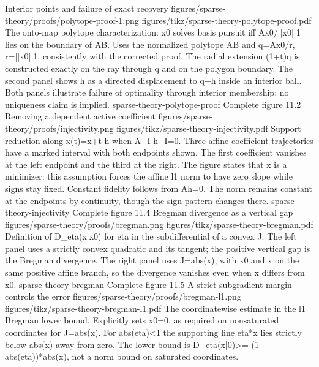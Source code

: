 {Interior points and failure of exact recovery}
{figures/sparse-theory/proofs/polytope-proof-1.png}
{figures/tikz/sparse-theory-polytope-proof.pdf}
{The onto-map polytope characterization: x0 solves basis pursuit iff Ax0/||x0||1 lies on the boundary of AB.}
{Uses the normalized polytope AB and q=Ax0/r, r=||x0||1, consistently with the corrected proof. The radial extension (1+t)q is constructed exactly on the ray through q and on the polygon boundary. The second panel shows h as a directed displacement to q+h inside an interior ball. Both panels illustrate failure of optimality through interior membership; no uniqueness claim is implied.}
{sparse-theory-polytope-proof}
{Complete figure}
{11.2}
{Removing a dependent active coefficient}
{figures/sparse-theory/proofs/injectivity.png}
{figures/tikz/sparse-theory-injectivity.pdf}
{Support reduction along x(t)=x+t h when A\_I h\_I=0.}
{Three affine coefficient trajectories have a marked interval with both endpoints shown. The first coefficient vanishes at the left endpoint and the third at the right. The figure states that x is a minimizer: this assumption forces the affine l1 norm to have zero slope while signs stay fixed. Constant fidelity follows from Ah=0. The norm remains constant at the endpoints by continuity, though the sign pattern changes there.}
{sparse-theory-injectivity}
{Complete figure}
{11.4}
{Bregman divergence as a vertical gap}
{figures/sparse-theory/proofs/bregman.png}
{figures/tikz/sparse-theory-bregman.pdf}
{Definition of D\_eta(x|x0) for eta in the subdifferential of a convex J.}
{The left panel uses a strictly convex quadratic and its tangent; the positive vertical gap is the Bregman divergence. The right panel uses J=abs(x), with x0 and x on the same positive affine branch, so the divergence vanishes even when x differs from x0.}
{sparse-theory-bregman}
{Complete figure}
{11.5}
{A strict subgradient margin controls the error}
{figures/sparse-theory/proofs/bregman-l1.png}
{figures/tikz/sparse-theory-bregman-l1.pdf}
{The coordinatewise estimate in the l1 Bregman lower bound.}
{Explicitly sets x0=0, as required on nonsaturated coordinates for J=abs(x). For abs(eta)<1 the supporting line eta*x lies strictly below abs(x) away from zero. The lower bound is D\_eta(x|0)>= (1-abs(eta))*abs(x), not a norm bound on saturated coordinates.}

